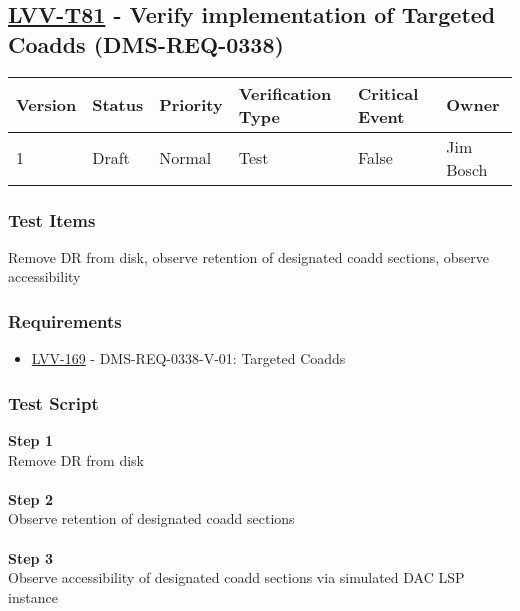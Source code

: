 \hypertarget{lvv-t81---verify-implementation-of-targeted-coadds-dms-req-0338}{%
\subsection{\texorpdfstring{\href{https://jira.lsstcorp.org/secure/Tests.jspa\#/testCase/LVV-T81}{LVV-T81}
- Verify implementation of Targeted Coadds
(DMS-REQ-0338)}{LVV-T81 - Verify implementation of Targeted Coadds (DMS-REQ-0338)}}\label{lvv-t81---verify-implementation-of-targeted-coadds-dms-req-0338}}

\begin{longtable}[]{@{}llllll@{}}
\toprule
Version & Status & Priority & Verification Type & Critical Event &
Owner\tabularnewline
\midrule
\endhead
1 & Draft & Normal & Test & False & Jim Bosch\tabularnewline
\bottomrule
\end{longtable}

\hypertarget{test-items-57}{%
\subsubsection{Test Items}\label{test-items-57}}

​​​​Remove DR from disk, observe retention of designated coadd sections,
observe accessibility

\hypertarget{requirements-58}{%
\subsubsection{Requirements}\label{requirements-58}}

\begin{itemize}
\tightlist
\item
  \href{https://jira.lsstcorp.org/browse/LVV-169}{LVV-169} -
  DMS-REQ-0338-V-01: Targeted Coadds
\end{itemize}

\hypertarget{test-script-58}{%
\subsubsection{Test Script}\label{test-script-58}}

\textbf{Step 1}\\
Remove DR from disk\\
~\\
\textbf{Step 2}\\
Observe retention of designated coadd sections\\
~\\
\textbf{Step 3}\\
Observe accessibility of designated coadd sections via simulated DAC LSP
instance\\
~\\

